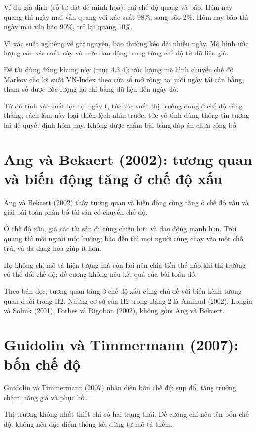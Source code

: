 \begin{tcolorbox}[breakable]
Ví dụ giả định (số tự đặt để minh họa): hai chế độ quang và bão. Hôm nay quang thì ngày mai vẫn quang với xác suất 98\%, sang bão 2\%. Hôm nay bão thì ngày mai vẫn bão 90\%, trở lại quang 10\%.

Vì xác suất nghiêng về giữ nguyên, bão thường kéo dài nhiều ngày. Mô hình ước lượng các xác suất này và mức dao động trong từng chế độ từ dữ liệu giá.
\end{tcolorbox}

Đề tài dùng đúng khung này (mục 4.3.4): ước lượng mô hình chuyển chế độ Markov cho lợi suất VN-Index theo cửa sổ mở rộng; tại mỗi ngày tái cân bằng, tham số được ước lượng lại chỉ bằng dữ liệu đến ngày đó.

Từ đó tính xác suất lọc tại ngày t, tức xác suất thị trường đang ở chế độ căng thẳng; cách làm này loại thiên lệch nhìn trước, tức vô tình dùng thông tin tương lai để quyết định hôm nay. Không được chấm bài bằng đáp án chưa công bố.

\section{Ang và Bekaert (2002): tương quan và biến động tăng ở chế độ xấu}

Ang và Bekaert (2002) thấy tương quan và biến động cùng tăng ở chế độ xấu và giải bài toán phân bổ tài sản có chuyển chế độ.

Ở chế độ xấu, giá các tài sản đi cùng chiều hơn và dao động mạnh hơn. Trời quang thì mỗi người một hướng; bão đến thì mọi người cùng chạy vào một chỗ trú, và đa dạng hóa giúp ít hơn.

Họ không chỉ mô tả hiện tượng mà còn hỏi nên chia tiền thế nào khi thị trường có thể đổi chế độ; đề cương không nêu kết quả của bài toán đó.

Theo bản đọc, tương quan tăng ở chế độ xấu cùng chủ đề với biến kênh tương quan đuôi trong H2. Nhưng cơ sở của H2 trong Bảng 2 là Amihud (2002), Longin và Solnik (2001), Forbes và Rigobon (2002), không gồm Ang và Bekaert.

\section{Guidolin và Timmermann (2007): bốn chế độ}

Guidolin và Timmermann (2007) nhận diện bốn chế độ: sụp đổ, tăng trưởng chậm, tăng giá và phục hồi.

Thị trường không nhất thiết chỉ có hai trạng thái. Đề cương chỉ nêu tên bốn chế độ, không nêu đặc điểm thống kê; đừng tự mô tả thêm.

